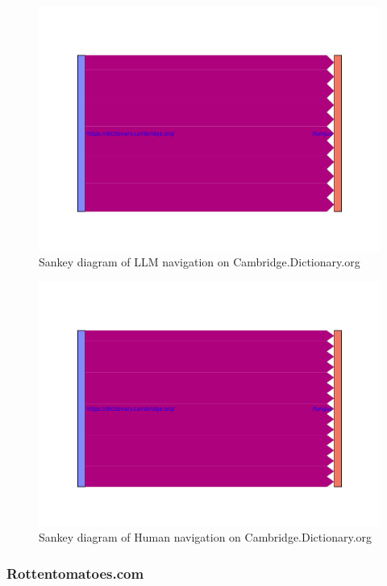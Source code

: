 \begin{figure}[H]
    \centering
    \includegraphics[width=\textwidth]{obrazky-figures/sankey_dictionary_llm.pdf}
    \caption{Sankey diagram of LLM navigation on Cambridge.Dictionary.org}
    \label{sankey_dictionary_llm}
\end{figure}

\begin{figure}[H]
    \centering
    \includegraphics[width=\textwidth]{obrazky-figures/sankey_dictionary_human.pdf}
    \caption{Sankey diagram of Human navigation on Cambridge.Dictionary.org}
    \label{sankey_dictionary_human}
\end{figure}

\subsubsection{Rottentomatoes.com}

